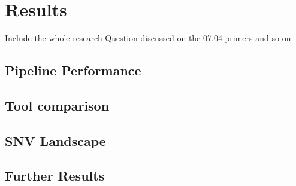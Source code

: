


\chapter{Results} 

\label{Chapter3} 

Include the whole research Question discussed on the 07.04 primers and so on

\section{Pipeline Performance}



\section{Tool comparison}

\section{SNV Landscape}


\section{Further Results}


